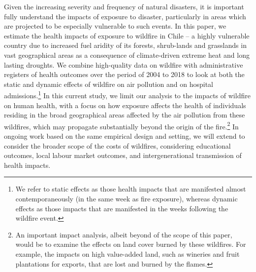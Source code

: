 \documentclass[11pt]{article}
\begin{document}
\begin{spacing}{1.5}


Given the increasing severity and frequency of natural disasters, it is important fully understand the impacts of exposure to disaster, particularly in areas which are projected to be especially vulnerable to such events.  In this paper, we estimate the health impacts of exposure to wildfire in Chile -- a highly vulnerable country due to increased fuel aridity of its forests, shrub-lands and grasslands in vast geographical areas as a consequence of climate-driven extreme heat and long lasting droughts. We combine high-quality data on wildfire with administrative registers of health outcomes over the period of 2004 to 2018 to look at both the static and dynamic effects of wildfire on air pollution and on hospital admissions.\footnote{We refer to static effects as those health impacts that are manifested almost contemporaneously (in the same week as fire exposure), whereas dynamic effects as those impacts that are manifested in the weeks following the wildfire event.}  In this current study, we limit our analysis to the impacts of wildfire on human health, with a focus on how exposure affects the health of individuals residing in the broad geographical areas affected by the air pollution from these wildfires, which may propagate substantially beyond the origin of the fire.\footnote{An important impact analysis, albeit beyond of the scope of this paper, would be to examine the effects on land cover burned by these wildfires. For example, the impacts on high value-added land, such as wineries and fruit plantations for exports, that are lost and burned by the flames.}  In ongoing work based on the same empirical design and setting, we will extend to consider the broader scope of the costs of wildfires, considering educational outcomes, local labour market outcomes, and intergenerational transmission of health impacts.


\end{spacing}
\end{document}
